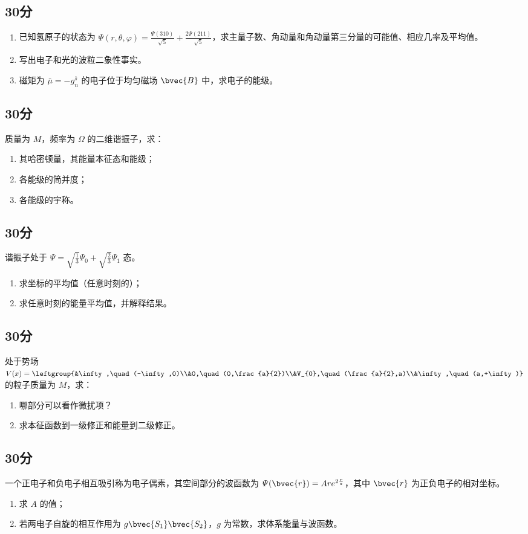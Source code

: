 
\subsection{30分}
\begin{enumerate}
\item 已知氢原子的状态为 $\varPsi (r,\theta,\varphi)=\frac{\varPsi (310)}{\sqrt{5}}+\frac{2\varPsi (211)}{\sqrt{5}}$，求主量子数、角动量和角动量第三分量的可能值、相应几率及平均值。
\item 写出电子和光的波粒二象性事实。
\item 磁矩为 $\bar{\mu}=-g^{\bar{s}}_{n}$ 的电子位于均匀磁场 $\bvec{B}$ 中，求电子的能级。
\end{enumerate}
\subsection{30分}
质量为 $M$，频率为 $\Omega$ 的二维谐振子，求：
\begin{enumerate}
\item 其哈密顿量，其能量本征态和能级；
\item 各能级的简并度；
\item 各能级的宇称。
\end{enumerate}
\subsection{30分}
谐振子处于 $\varPsi =\sqrt{\frac{1}{3}}\varPsi_{0}+\sqrt{\frac{2}{3}}\varPsi_{1}$ 态。
\begin{enumerate}
\item 求坐标的平均值（任意时刻的）；
\item 求任意时刻的能量平均值，并解释结果。
\end{enumerate}
\subsection{30分}
处于势场 $V(x)=\leftgroup{&\infty,\quad (-\infty,0)\\&0,\quad (0,\frac{a}{2})\\&V_{0},\quad (\frac{a}{2},a)\\&\infty,\quad (a,+\infty)}$ 的粒子质量为 $M$，求：
\begin{enumerate}
\item 哪部分可以看作微扰项？
\item 求本征函数到一级修正和能量到二级修正。
\end{enumerate}
\subsection{30分}
一个正电子和负电子相互吸引称为电子偶素，其空间部分的波函数为 $\varPsi (\bvec{r})=Are^{2\frac{r}{a}}$，其中 $\bvec{r}$ 为正负电子的相对坐标。
\begin{enumerate}
\item 求 $A$ 的值；
\item 若两电子自旋的相互作用为 $g\bvec{S_{1}}\bvec{S_{2}}$，$g$ 为常数，求体系能量与波函数。
\end{enumerate}

